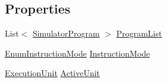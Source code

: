\subsection*{Properties}
\begin{DoxyCompactItemize}
\item 
List$<$ \hyperlink{class_c_p_u___o_s___simulator_1_1_c_p_u_1_1_simulator_program}{Simulator\+Program} $>$ \hyperlink{class_c_p_u___o_s___simulator_1_1_main_window_a632c91cdd16a7498bbb8dfb3e5df252c}{Program\+List}
\item 
\hyperlink{namespace_c_p_u___o_s___simulator_adc17a5a5e004084f05dc8e4d3f70e31f}{Enum\+Instruction\+Mode} \hyperlink{class_c_p_u___o_s___simulator_1_1_main_window_a65916937137002c26f9eb1c88cfff519}{Instruction\+Mode}
\item 
\hyperlink{class_c_p_u___o_s___simulator_1_1_c_p_u_1_1_execution_unit}{Execution\+Unit} \hyperlink{class_c_p_u___o_s___simulator_1_1_main_window_a3d03550a73d7ab18ebd143a38dbf1431}{Active\+Unit}
\end{DoxyCompactItemize}
